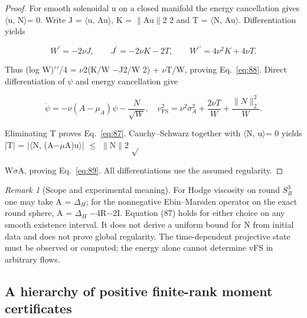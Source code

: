 \documentclass[10pt,letterpaper]{article}
\theoremstyle{remark}
\newtheorem{remark}[theorem]{Remark}
\begin{document}
\begin{proof}
For smooth solenoidal u on a closed manifold the energy cancellation gives \(\langle \)u, N\(\rangle \)= 0. Write J = \(\langle \)u, Au\(\rangle \), K = \(\| \)Au\(\| \)2 2 and T = \(\langle \)N, Au\(\rangle \). Differentiation yields


\begin{equation}
\tag{90}\label{eq:90}
W^\prime=-2\nu J,\qquad J^\prime=-2\nu K-2T,\qquad W^{\prime\prime}=4\nu^2 K+4\nu T.
\end{equation}

Thus (log W)\(\prime\)\(\prime\)/4 = \(\nu \)2(K/W \(- \)J2/W 2) + \(\nu \)T/W, proving Eq.~\eqref{eq:88}. Direct differentiation of \(\psi \) and energy cancellation give



\begin{equation}
\tag{91}\label{eq:91}
\dot\psi=-\nu(A-\mu_A)\psi-\frac N{\sqrt W},\quad v_{\mathrm{FS}}^2=\nu^2\sigma_A^2+\frac{2\nu T}{W}+\frac{\|N\|_2^2}{W}.
\end{equation}

Eliminating T proves Eq.~\eqref{eq:87}. Cauchy–Schwarz together with \(\langle \)N, u\(\rangle \)= 0 yields |T| = |\(\langle \)N, (A\(- \mu \)A)u\(\rangle \)| \(\le \) \(\| \)N\(\| \)2 \(\sqrt{} \)


W\(\sigma \)A, proving Eq.~\eqref{eq:89}. All differentiations use the assumed regularity.


\end{proof}

\begin{remark}[Scope and experimental meaning]

For Hodge viscosity on round \(S_R^3\) one may take A = \(\Delta_H\); for the nonnegative Ebin–Marsden operator on the exact round sphere, A = \(\Delta_H\) \(- \)4R\(- \)2I. Equation (87) holds for either choice on any smooth existence interval. It does not derive a uniform bound for N from initial data and does not prove global regularity. The time-dependent projective state must be observed or computed; the energy alone cannot determine vFS in arbitrary flows.

\end{remark}

\subsection{A hierarchy of positive finite-rank moment certificates}
\end{document}
